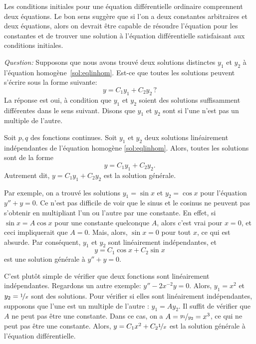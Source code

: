 \medskip

Les conditions initiales pour une équation différentielle ordinaire comprennent deux équations. Le bon sens suggère que si l'on a deux constantes arbitraires et deux équations, alors on devrait être capable de résoudre l'équation pour les constantes et de trouver une solution à l'équation différentielle satisfaisant aux conditions initiales. 

\emph{Question:} Supposons que nous avons trouvé deux solutions distinctes $y_1$ et $y_2$ à l'équation homogène~\eqref{sol:eqlinhom}.  Est-ce que toutes les solutions peuvent s'écrire sous la forme suivante:
\begin{equation*}
	y = C_1 y_1 + C_2 y_2\,?
\end{equation*}
La réponse est oui, à condition que $y_1$ et $y_2$ soient des solutions suffisamment différentes dans le sens suivant.  Disons que $y_1$ et $y_2$ sont \emph{} si l'une n'est pas un multiple de l'autre.

\begin{theorem}
	Soit $p, q$ des fonctions continues.
	Soit $y_1$ et $y_2$ deux solutions linéairement indépendantes de l'équation homogène \eqref{sol:eqlinhom}. 
	Alors, toutes les solutions sont de la forme 
	\begin{equation*}
		y = C_1 y_1 + C_2 y_2 .
	\end{equation*}
	Autrement dit, $y = C_1 y_1 + C_2 y_2$ est la solution générale.
\end{theorem}

Par exemple, on a trouvé les solutions 
$y_1 = \sin x$ et $y_2 = \cos x$ pour l'équation $y'' + y = 0$.  Ce n'est pas difficile de voir que le sinus et le cosinus ne peuvent pas s'obtenir en multipliant l'un ou l'autre par une constante.
En effet, si $\sin x = A \cos x$ pour une constante quelconque $A$,
alors c'est vrai pour $x=0$, et ceci impliquerait que  $A = 0$.  
Mais, alors, $\sin x = 0$ pour tout $x$, ce qui est absurde.
Par conséquent, $y_1$ et $y_2$ sont linéairement indépendantes, et
\begin{equation*}
	y = C_1 \cos x + C_2 \sin x 
\end{equation*}
est une solution générale à $y'' + y = 0$.


C'est plutôt simple de vérifier que deux fonctions sont linéairement indépendantes. 
Regardons un autre exemple:    $y''-2x^{-2}y = 0$.  
Alors, $y_1 = x^2$ et $y_2 = \nicefrac{1}{x}$ sont des solutions.  
Pour vérifier si elles sont linéairement indépendantes, supposons que l'une est un  multiple de l'autre : 
$y_1 = A y_2$.  Il suffit de vérifier que  $A$ ne peut pas être une constante.  
Dans ce cas, on a $A = \nicefrac{y_1}{y_2} = x^3$, ce qui ne peut pas être une constante. 
Alors, $y = C_1 x^2 + C_2 \nicefrac{1}{x}$ est la solution générale à l'équation différentielle.

